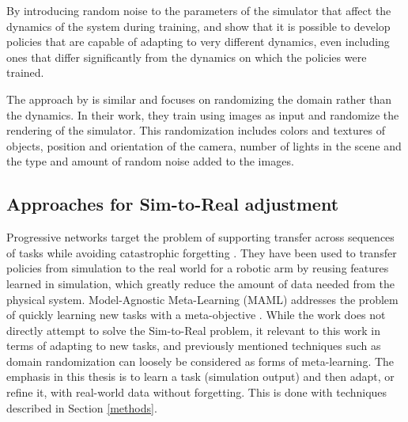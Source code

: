 By introducing random noise to the parameters of the simulator that affect the dynamics of the system during training, \parencite{Antonova2017} and \parencite{peng} show that it is possible to develop policies that are capable of adapting to very different dynamics, even including ones that differ significantly from the dynamics on which the policies were trained.

The approach by \parencite{tobin} is similar and focuses on randomizing the domain rather than the dynamics. In their work, they train using images as input and randomize the rendering of the simulator. This randomization includes colors and textures of objects, position and orientation of the camera, number of lights in the scene and the type and amount of random noise added to the images.

\subsection{Approaches for Sim-to-Real adjustment}
Progressive networks \parencite{Rusu2016} target the problem of supporting transfer across sequences of tasks while avoiding catastrophic forgetting \parencite{French2006CatastrophicFI}. They have been used to transfer policies from simulation to the real world for a robotic arm \parencite{rusu2016simtoreal} by reusing features learned in simulation, which greatly reduce the amount of data needed from the physical system. Model-Agnostic Meta-Learning (MAML) addresses the problem of quickly learning new tasks with a meta-objective \parencite{Finn2017}. While the work does not directly attempt to solve the Sim-to-Real problem, it relevant to this work in terms of adapting to new tasks, and previously mentioned techniques such as domain randomization can loosely be considered as forms of meta-learning. 
The emphasis in this thesis is to learn a task (simulation output) and then adapt, or refine it, with real-world data without forgetting. This is done with techniques described in Section \ref{methods}.




